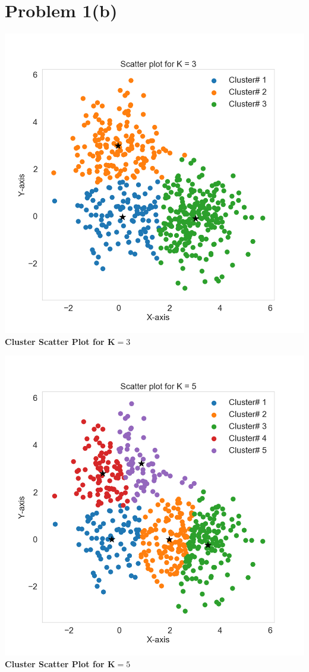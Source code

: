 \documentclass[openany,11pt]{homework}
\begin{document}
\section*{Problem 1(b)}
\begin{center}
	\centering
	\includegraphics[width = \textwidth]{1b_3.png}
	\textbf{Cluster Scatter Plot for K$=3$}
\end{center}

\begin{center}
	\centering
	\includegraphics[width = \textwidth]{1b_5.png}
	\textbf{Cluster Scatter Plot for K$=5$}
\end{center}
\end{document}
